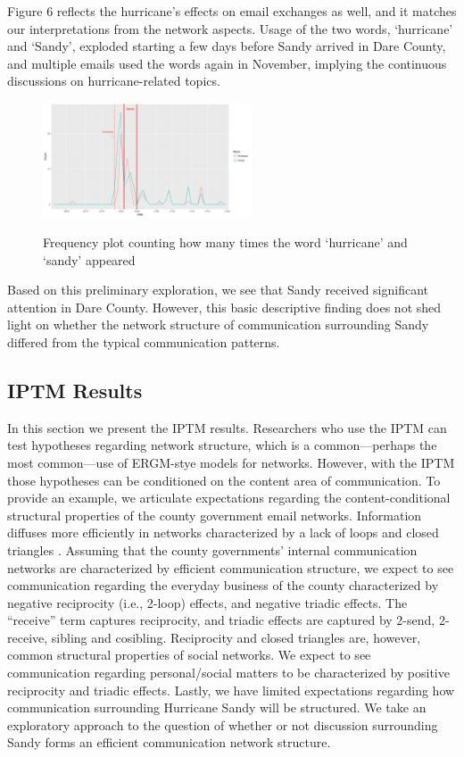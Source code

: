 \documentclass[a4paper]{article}
\begin{document}
Figure 6 reflects the hurricane's effects on email exchanges as well, and it matches our interpretations from the network aspects. Usage of the two words, `hurricane' and `Sandy', exploded starting a few days before Sandy arrived in Dare County, and multiple emails used the words again in November, implying the continuous discussions on hurricane-related topics.
            \begin{figure}[ht]
            	\centering
            	\includegraphics[width=0.55\textwidth]{plots/DareWord-1.png}  
            	\label{fig:WordDare}
            	\caption{Frequency plot counting how many times the word `hurricane' and `sandy' appeared}
            \end{figure}
   
  Based on this preliminary exploration, we see that Sandy received significant attention in Dare County. However, this basic descriptive finding does not shed light on whether the network structure of communication surrounding Sandy differed from the typical communication patterns. 
   \subsection{IPTM Results} \label{subsec: IPTM results}
   
   In this section we present the IPTM results. Researchers who use the IPTM can test hypotheses regarding network structure, which is a common---perhaps the most common---use of ERGM-stye models for networks. However, with the IPTM those hypotheses can be conditioned on the content area of communication. To provide an example, we articulate expectations regarding the content-conditional structural properties of the county government email networks. Information diffuses more efficiently in networks characterized by a lack of loops \citep{lin2010measuring,iribarren2011branching} and closed triangles \citep{roca2010topological,tadic2004information}. Assuming that the county governments' internal communication networks are characterized by efficient communication structure,  we expect to see communication regarding the everyday business of the county characterized by negative reciprocity (i.e., 2-loop) effects, and negative triadic effects. The ``receive'' term captures reciprocity, and triadic effects are captured by 2-send, 2-receive, sibling and cosibling. Reciprocity and closed triangles are, however, common structural properties of social networks. We expect to see communication regarding personal/social matters to be characterized by positive reciprocity and triadic effects. Lastly, we have limited expectations regarding how communication surrounding Hurricane Sandy will be structured. We take an exploratory approach to the question of whether or not discussion surrounding Sandy forms an efficient communication network structure.
\end{document}
